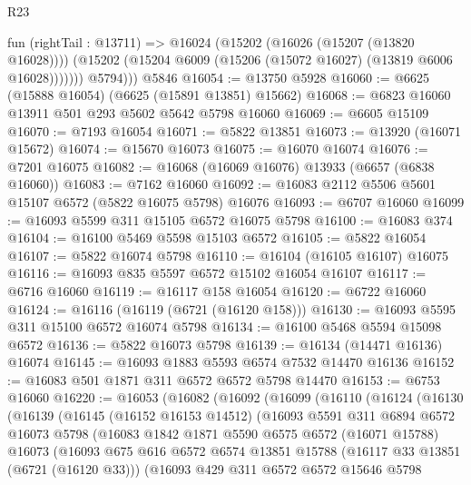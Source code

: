 \begin{lexlean}{R23}
\begin{coremodule}
            fun (rightTail : @13711) =>
            @16024
              (@15202 (@16026 (@15207 (@13820 @16028))))
              (@15202 (@15204 @6009 (@15206 (@15072 @16027) (@13819 @6006 @16028)))))))
          @5794)))
    @5846
@16054 := @13750 @5928
@16060 := @6625 (@15888 @16054) (@6625 (@15891 @13851) @15662)
@16068 := @6823 @16060 @13911 @501 @293 @5602 @5642 @5798 @16060
@16069 := @6605 @15109
@16070 := @7193 @16054
@16071 := @5822 @13851
@16073 := @13920 (@16071 @15672)
@16074 := @15670 @16073
@16075 := @16070 @16074
@16076 := @7201 @16075
@16082 := @16068 (@16069 @16076) @13933 (@6657 (@6838 @16060))
@16083 := @7162 @16060
@16092 := @16083 @2112 @5506 @5601 @15107 @6572 (@5822 @16075 @5798) @16076
@16093 := @6707 @16060
@16099 := @16093 @5599 @311 @15105 @6572 @16075 @5798
@16100 := @16083 @374
@16104 := @16100 @5469 @5598 @15103 @6572
@16105 := @5822 @16054
@16107 := @5822 @16074 @5798
@16110 := @16104 (@16105 @16107) @16075
@16116 := @16093 @835 @5597 @6572 @15102 @16054 @16107
@16117 := @6716 @16060
@16119 := @16117 @158 @16054
@16120 := @6722 @16060
@16124 := @16116 (@16119 (@6721 (@16120 @158)))
@16130 := @16093 @5595 @311 @15100 @6572 @16074 @5798
@16134 := @16100 @5468 @5594 @15098 @6572
@16136 := @5822 @16073 @5798
@16139 := @16134 (@14471 @16136) @16074
@16145 := @16093 @1883 @5593 @6574 @7532 @14470 @16136
@16152 := @16083 @501 @1871 @311 @6572 @6572 @5798 @14470
@16153 := @6753 @16060
@16220 := @16053
    (@16082
      (@16092
        (@16099
          (@16110
            (@16124
              (@16130
                (@16139
                  (@16145
                    (@16152 @16153 @14512)
                    (@16093
                      @5591
                      @311
                      @6894
                      @6572
                      @16073
                      @5798
                      (@16083
                        @1842
                        @1871
                        @5590
                        @6575
                        @6572
                        (@16071 @15788)
                        @16073
                        (@16093
                          @675
                          @616
                          @6572
                          @6574
                          @13851
                          @15788
                          (@16117 @33 @13851 (@6721 (@16120 @33)))
                          (@16093
                            @429
                            @311
                            @6572
                            @6572
                            @15646
                            @5798

\end{coremodule}
\end{lexlean}
